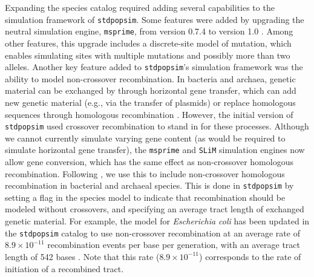 \documentclass[hidelinks]{article}
\newcommand{\stdpopsim}{\texttt{stdpopsim}\xspace}
\begin{document}
Expanding the species catalog required adding several capabilities to the simulation framework of \stdpopsim.
Some features were added by upgrading the neutral simulation engine, \texttt{msprime}, from version 0.7.4 to version 1.0 \citep{Baumdicker2022}.
Among other features, this upgrade includes a discrete-site model of mutation,
which enables simulating sites with multiple mutations and possibly more than two alleles.
Another key feature added to \stdpopsim's simulation framework was the ability to model non-crossover recombination.
In bacteria and archaea, genetic material can be exchanged by through horizontal gene transfer,
which can add new genetic material (e.g., via the transfer of plasmids)
or replace homologous sequences through homologous recombination \citep{Thomas2005,Didelot2010,Gophna2022}.
However, the initial version of \stdpopsim used crossover recombination to stand in for these processes.
Although we cannot currently simulate varying gene content (as would be required to simulate horizontal gene transfer),
the \texttt{msprime} and \texttt{SLiM} simulation engines now allow gene conversion,
which has the same effect as non-crossover homologous recombination.
Following \citet{Cury2022}, we use this to include non-crossover homologous recombination in bacterial and archaeal species.
This is done in \stdpopsim by setting a flag in the species model to indicate that recombination should be modeled without crossovers,
and specifying an average tract length of exchanged genetic material.
For example, the model for \textit{Escherichia coli} has been updated in the \stdpopsim catalog to use non-crossover recombination at an average rate of $8.9\times 10^{-11}$ recombination events per base per generation,
with an average tract length of 542 bases \citep{Wielgoss2011,Didelot2012}.
Note that this rate ($8.9\times 10^{-11}$) corresponds to the rate of initiation of a recombined tract.
\end{document}
